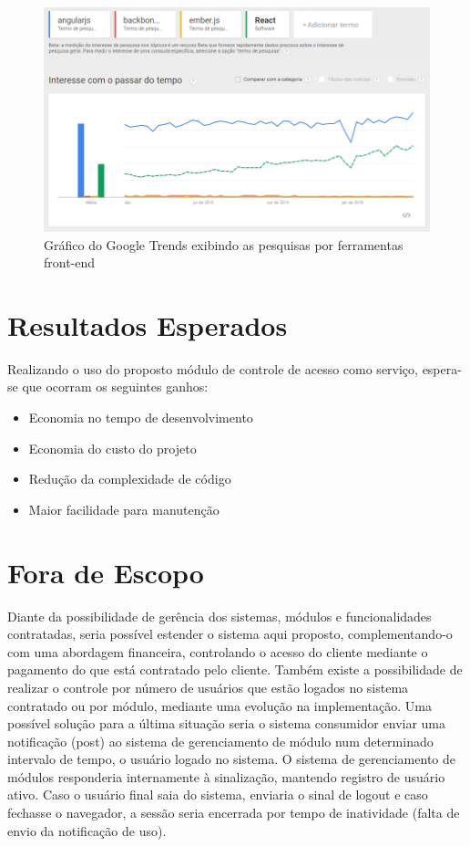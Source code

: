 \begin{figure} %
	\label{fig:graficoGoogleTrendsFerramentasFront}
	\includegraphics[width=1\textwidth]{img/grafico_ferramentas_front}
	\caption{Gráfico do Google Trends exibindo as pesquisas por ferramentas front-end}
\end{figure}


\section{Resultados Esperados}


Realizando o uso do proposto módulo de controle de acesso como serviço, espera-se que ocorram os seguintes ganhos:


\begin{itemize}
	\item Economia no tempo de desenvolvimento
	\item Economia do custo do projeto
	\item Redução da complexidade de código
	\item Maior facilidade para manutenção
\end{itemize}


\section{Fora de Escopo}


Diante da possibilidade de gerência dos sistemas, módulos e funcionalidades contratadas, seria possível estender o sistema aqui proposto, complementando-o com uma abordagem financeira, controlando o acesso do cliente mediante o pagamento do que está contratado pelo cliente. Também existe a possibilidade de realizar o controle por número de usuários que estão logados no sistema contratado ou por módulo, mediante uma evolução na implementação. Uma possível solução para a última situação seria o sistema consumidor enviar uma notificação (post) ao sistema de gerenciamento de módulo num determinado intervalo de tempo, o usuário logado no sistema. O sistema de gerenciamento de módulos responderia internamente à sinalização, mantendo registro de usuário ativo. Caso o usuário final saia do sistema, enviaria o sinal de logout e caso fechasse o navegador, a sessão seria encerrada por tempo de inatividade (falta de envio da notificação de uso).


